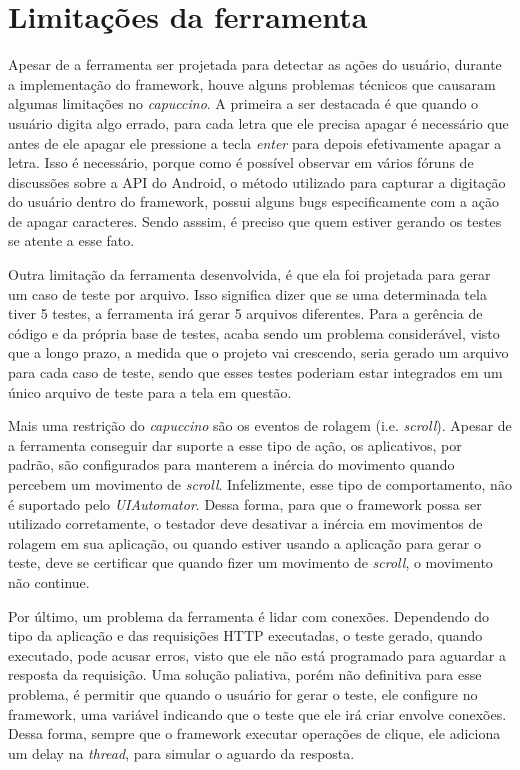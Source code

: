 \documentclass[
    12pt,       %
    openright,      %
    twoside,      %
    a4paper,      %
    english,      %
    french,       %
    spanish,      %
    brazil,       %
    ]{abntex2}
\begin{document}
      \section{Limitações da ferramenta}
        Apesar de a ferramenta ser projetada para detectar as ações do usuário, durante a implementação
        do framework, houve alguns problemas técnicos que causaram algumas limitações no \textit{capuccino}.
        A primeira a ser destacada é que quando o usuário digita algo errado, para cada
        letra que ele precisa apagar é necessário que antes de ele apagar ele pressione a tecla \textit{enter}
        para depois efetivamente apagar a letra. Isso é necessário, porque como é possível observar em vários
        fóruns de discussões sobre a API do Android, o método utilizado para capturar a digitação do usuário
        dentro do framework, possui alguns bugs especificamente com a ação de apagar caracteres. Sendo asssim,
        é preciso que quem estiver gerando os testes se atente a esse fato.

        Outra limitação da ferramenta desenvolvida, é que ela foi projetada para gerar um caso de teste por
        arquivo. Isso significa dizer que se uma determinada tela tiver 5 testes, a ferramenta irá gerar 5
        arquivos diferentes. Para a gerência de código e da própria base de testes, acaba sendo um problema considerável, visto que a longo prazo, a medida que o projeto vai crescendo, seria gerado um arquivo
        para cada caso de teste, sendo que esses testes poderiam estar integrados em um único arquivo de teste
        para a tela em questão.

        Mais uma restrição do \textit{capuccino} são os eventos de rolagem (i.e. \textit{scroll}). Apesar de
        a ferramenta conseguir dar suporte a esse tipo de ação, os aplicativos, por padrão, são configurados
        para manterem a inércia do movimento quando percebem um movimento de \textit{scroll}. Infelizmente,
        esse tipo de comportamento, não é suportado pelo \textit{UIAutomator}. Dessa forma, para que o framework
        possa ser utilizado corretamente, o testador deve desativar a inércia em movimentos de rolagem em
        sua aplicação, ou quando estiver usando a aplicação para gerar o teste, deve se certificar que quando
        fizer um movimento de \textit{scroll}, o movimento não continue.

        Por último, um problema da ferramenta é lidar com conexões. Dependendo do tipo da aplicação
        e das requisições HTTP executadas, o teste gerado, quando executado, pode acusar erros, visto que ele
        não está programado para aguardar a resposta da requisição. Uma solução paliativa, porém não definitiva
        para esse problema, é permitir que quando o usuário for gerar o teste, ele configure no framework, uma
        variável indicando que o teste que ele irá criar envolve conexões. Dessa forma, sempre que o framework
        executar operações de clique, ele adiciona um delay na \textit{thread}, para simular o aguardo da
        resposta.
\end{document}
